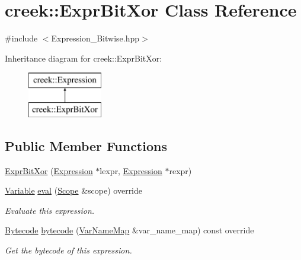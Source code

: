 \hypertarget{classcreek_1_1_expr_bit_xor}{}\section{creek\+:\+:Expr\+Bit\+Xor Class Reference}
\label{classcreek_1_1_expr_bit_xor}


{\ttfamily \#include $<$Expression\+\_\+\+Bitwise.\+hpp$>$}

Inheritance diagram for creek\+:\+:Expr\+Bit\+Xor\+:\begin{figure}[H]
\begin{center}
\leavevmode
\includegraphics[height=2.000000cm]{classcreek_1_1_expr_bit_xor}
\end{center}
\end{figure}
\subsection*{Public Member Functions}
\begin{DoxyCompactItemize}
\item 
\hyperlink{classcreek_1_1_expr_bit_xor_a290076717a8a8eed6c31e849f596728b}{Expr\+Bit\+Xor} (\hyperlink{classcreek_1_1_expression}{Expression} $\ast$lexpr, \hyperlink{classcreek_1_1_expression}{Expression} $\ast$rexpr)
\item 
\hyperlink{classcreek_1_1_variable}{Variable} \hyperlink{classcreek_1_1_expr_bit_xor_a291257ee80afb487e727858ae59fdee9}{eval} (\hyperlink{classcreek_1_1_scope}{Scope} \&scope) override
\begin{DoxyCompactList}\small\item\em Evaluate this expression. \end{DoxyCompactList}\item 
\hyperlink{classcreek_1_1_bytecode}{Bytecode} \hyperlink{classcreek_1_1_expr_bit_xor_a3032fd3c599f1b0ef90e7d26946bf172}{bytecode} (\hyperlink{classcreek_1_1_var_name_map}{Var\+Name\+Map} \&var\+\_\+name\+\_\+map) const  override\hypertarget{classcreek_1_1_expr_bit_xor_a3032fd3c599f1b0ef90e7d26946bf172}{}\label{classcreek_1_1_expr_bit_xor_a3032fd3c599f1b0ef90e7d26946bf172}

\begin{DoxyCompactList}\small\item\em Get the bytecode of this expression. \end{DoxyCompactList}\end{DoxyCompactItemize}



